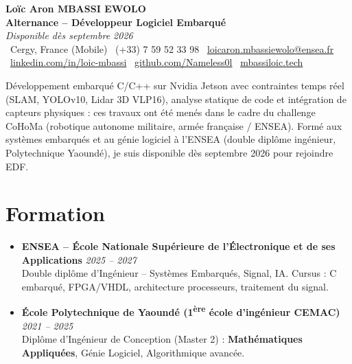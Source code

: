 \documentclass[a4paper,11pt]{article}
\begin{document}
\begin{center}
    {\Large \textbf{Loïc Aron MBASSI EWOLO}} \\ \vspace{4pt}
    \textbf{\large Alternance -- Développeur Logiciel Embarqué} \\
    \textit{\small Disponible dès septembre 2026} \\ \vspace{4pt}
    \small
    \faMapMarker\ Cergy, France (Mobile) \quad
    \faPhone\ (+33) 7 59 52 33 98 \quad
    \faEnvelope\ \href{mailto:loicaron.mbassiewolo@ensea.fr}{loicaron.mbassiewolo@ensea.fr} \\ \vspace{2pt}
    \faLinkedin\ \href{https://www.linkedin.com/in/loic-mbassi/}{linkedin.com/in/loic-mbassi} \quad
    \faGithub\ \href{https://github.com/Nameless0l}{github.com/Nameless0l} \quad
    \faGlobe\ \href{https://mbassiloic.tech}{mbassiloic.tech}
\end{center}

\vspace{-6pt}

\noindent\small{Développement embarqué C/C++ sur Nvidia Jetson avec contraintes temps réel (SLAM, YOLOv10, Lidar 3D VLP16), analyse statique de code et intégration de capteurs physiques : ces travaux ont été menés dans le cadre du challenge CoHoMa (robotique autonome militaire, armée française / ENSEA). Formé aux systèmes embarqués et au génie logiciel à l'ENSEA (double diplôme ingénieur, Polytechnique Yaoundé), je suis disponible dès septembre 2026 pour rejoindre EDF.}

\vspace{2pt}

\section{Formation}
\begin{itemize}[leftmargin=*, label=\tiny$\bullet$, nosep]
    \item \textbf{ENSEA -- École Nationale Supérieure de l'Électronique et de ses Applications} \hfill \textit{2025 -- 2027} \\
    \small{Double diplôme d'Ingénieur -- Systèmes Embarqués, Signal, IA. Cursus : C embarqué, FPGA/VHDL, architecture processeurs, traitement du signal.}
    \item \textbf{École Polytechnique de Yaoundé (1\textsuperscript{ère} école d'ingénieur CEMAC)} \hfill \textit{2021 -- 2025} \\
    \small{Diplôme d'Ingénieur de Conception (Master 2) : \textbf{Mathématiques Appliquées}, Génie Logiciel, Algorithmique avancée.}
\end{itemize}
\end{document}

